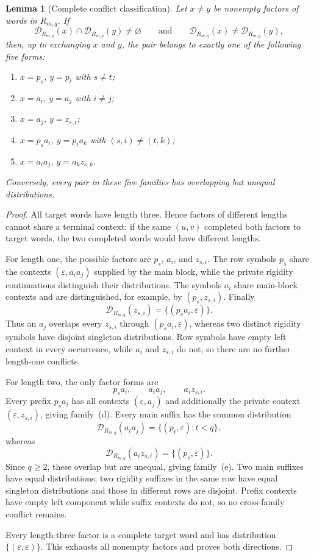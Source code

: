 \documentclass[11pt]{article}
\newtheorem{lemma}[theorem]{Lemma}
\theoremstyle{definition}
\theoremstyle{remark}
\newcommand{\eps}{\varepsilon}
\newcommand{\D}{\mathcal D}
\begin{document}
\begin{lemma}[Complete conflict classification]
\label{lem:R-conflicts}
Let \(x\ne y\) be nonempty factors of words in \(R_{m,q}\).  If
\[
 \D_{R_{m,q}}(x)\cap\D_{R_{m,q}}(y)\ne\varnothing
 \qquad\text{and}\qquad
 \D_{R_{m,q}}(x)\ne\D_{R_{m,q}}(y),
\]
then, up to exchanging \(x\) and \(y\), the pair belongs to exactly one of
the following five forms:
\begin{enumerate}[label=(\alph*),leftmargin=*]
\item \(x=p_s\), \(y=p_t\) with \(s\ne t\);
\item \(x=a_i\), \(y=a_j\) with \(i\ne j\);
\item \(x=a_j\), \(y=z_{s,i}\);
\item \(x=p_sa_i\), \(y=p_ta_k\) with \((s,i)\ne(t,k)\);
\item \(x=a_i a_j\), \(y=a_k z_{s,k}\).
\end{enumerate}
Conversely, every pair in these five families has overlapping but unequal
distributions.
\end{lemma}

\begin{proof}
All target words have length three.  Hence factors of different lengths cannot
share a terminal context: if the same \((u,v)\) completed both factors to
target words, the two completed words would have different lengths.

For length one, the possible factors are \(p_s\), \(a_i\), and \(z_{s,i}\).
The row symbols \(p_s\) share the contexts \((\eps,a_i a_j)\) supplied by
the main block, while the private rigidity continuations distinguish their
distributions.  The symbols \(a_i\) share main-block contexts and are
distinguished, for example, by \((p_s,z_{s,i})\).  Finally
\[
 \D_{R_{m,q}}(z_{s,i})=\{(p_sa_i,\eps)\}.
\]
Thus an \(a_j\) overlaps every \(z_{s,i}\) through
\((p_sa_i,\eps)\), whereas two distinct rigidity symbols have disjoint
singleton distributions.  Row symbols have empty left context in every
occurrence, while \(a_i\) and \(z_{s,i}\) do not, so there are no further
length-one conflicts.

For length two, the only factor forms are
\[
 p_sa_i,\qquad a_i a_j,\qquad a_i z_{s,i}.
\]
Every prefix \(p_sa_i\) has all contexts \((\eps,a_j)\) and additionally
the private context \((\eps,z_{s,i})\), giving family~(d).  Every main
suffix has the common distribution
\[
 \D_{R_{m,q}}(a_i a_j)=\{(p_t,\eps):t<q\},
\]
whereas
\[
 \D_{R_{m,q}}(a_i z_{s,i})=\{(p_s,\eps)\}.
\]
Since \(q\ge2\), these overlap but are unequal, giving family~(e).  Two
main suffixes have equal distributions; two rigidity suffixes in the same row
have equal singleton distributions and those in different rows are disjoint.
Prefix contexts have empty left component while suffix contexts do not, so no
cross-family conflict remains.

Every length-three factor is a complete target word and has distribution
\(\{(\eps,\eps)\}\).  This exhausts all nonempty factors and proves both
directions.
\end{proof}
\end{document}
